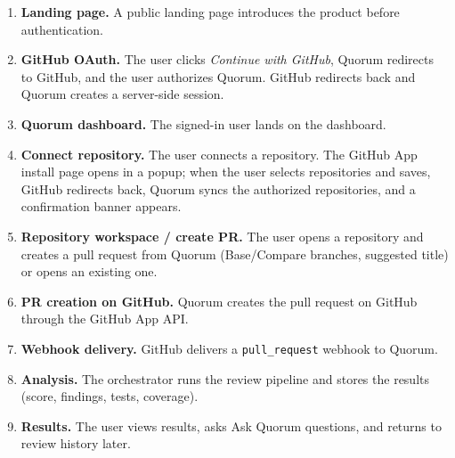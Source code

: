 \begin{enumerate}[leftmargin=1.2em]
  \item \textbf{Landing page.} A public landing page introduces the product
        before authentication.
  \item \textbf{GitHub OAuth.} The user clicks \emph{Continue with GitHub},
        Quorum redirects to GitHub, and the user authorizes Quorum. GitHub
        redirects back and Quorum creates a server-side session.
  \item \textbf{Quorum dashboard.} The signed-in user lands on the dashboard.
  \item \textbf{Connect repository.} The user connects a repository. The
        GitHub App install page opens in a popup; when the user selects
        repositories and saves, GitHub redirects back, Quorum syncs the
        authorized repositories, and a confirmation banner appears.
  \item \textbf{Repository workspace / create PR.} The user opens a
        repository and creates a pull request from Quorum (Base/Compare
        branches, suggested title) or opens an existing one.
  \item \textbf{PR creation on GitHub.} Quorum creates the pull request on
        GitHub through the GitHub App API.
  \item \textbf{Webhook delivery.} GitHub delivers a \texttt{pull\_request}
        webhook to Quorum.
  \item \textbf{Analysis.} The orchestrator runs the review pipeline and
        stores the results (score, findings, tests, coverage).
  \item \textbf{Results.} The user views results, asks Ask Quorum questions,
        and returns to review history later.
\end{enumerate}